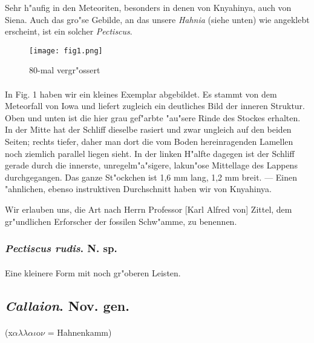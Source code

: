 \documentclass[a4paper, 11pt, oneside]{article}
\begin{document}
Sehr h"aufig in den Meteoriten, besonders in denen von Knyahinya, auch von Siena. Auch das gro"se Gebilde, an das unsere \emph{Hahnia} (siehe unten) wie angeklebt erscheint, ist ein solcher \emph{Pectiscus}.
\begin{figure}[H]
\centering
\texttt{[image: fig1.png]}
\caption{80-mal vergr"ossert}
\end{figure}
\paragraph{}
In Fig. 1 haben wir ein kleines Exemplar abgebildet. Es stammt von dem Meteorfall von Iowa und liefert zugleich ein deutliches Bild der inneren Struktur. Oben und unten ist die hier grau gef"arbte "au"sere Rinde des Stockes erhalten. In der Mitte hat der Schliff dieselbe rasiert und zwar ungleich auf den beiden Seiten; rechts tiefer, daher man dort die vom Boden hereinragenden Lamellen noch ziemlich parallel liegen sieht. In der linken H"alfte dagegen ist der Schliff gerade durch die innerste, unregelm"a"sigere, lakun"ose Mittellage des Lappens durchgegangen. Das ganze St"ockchen ist 1,6 mm lang, 1,2 mm breit. --- Einen "ahnlichen, ebenso instruktiven Durchschnitt haben wir von Knyahinya.

Wir erlauben uns, die Art nach Herrn Professor [Karl Alfred von] Zittel, dem gr"undlichen Erforscher der fossilen Schw"amme, zu benennen.
\subsubsection{\emph{Pectiscus rudis}. N. sp.}
\paragraph{}
Eine kleinere Form mit noch gr"oberen Leisten.
\subsection{\emph{Callaion}. Nov. gen.}
\paragraph{}
(x$\alpha\lambda\lambda\alpha\iota$o$\nu$ = Hahnenkamm)%
\end{document}
